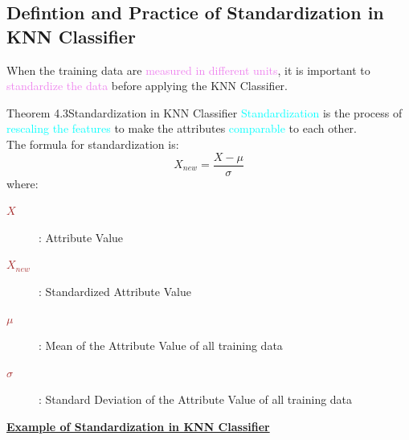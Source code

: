 \documentclass{book}
\begin{document}
\subsection{Defintion and Practice of Standardization in KNN Classifier}
When the training data are \textcolor{violet}{measured in different units}, it is important to \textcolor{violet}{standardize the data} before applying the KNN Classifier.\\
\begin{thmBox}{Theorem 4.3}{Standardization in KNN Classifier}
    \textcolor{cyan}{Standardization} is the process of \textcolor{cyan}{rescaling the features} to make the attributes \textcolor{cyan}{comparable} to each other.\\
    The formula for standardization is:
    \[
        X_{new} = \frac{X - \mu}{\sigma}
    \]
    where:
    \begin{description}
        \item[\textcolor{brown}{\(X\)}]: Attribute Value
        \item[\textcolor{brown}{\(X_{new}\)}]: Standardized Attribute Value
        \item[\textcolor{brown}{\(\mu\)}]: Mean of the Attribute Value of all training data
        \item[\textcolor{brown}{\(\sigma\)}]: Standard Deviation of the Attribute Value of all training data
    \end{description}
\end{thmBox}
\vspace{2mm}
\underline{\textbf{Example of Standardization in KNN Classifier}}\\
\vspace{1mm}
\end{document}
